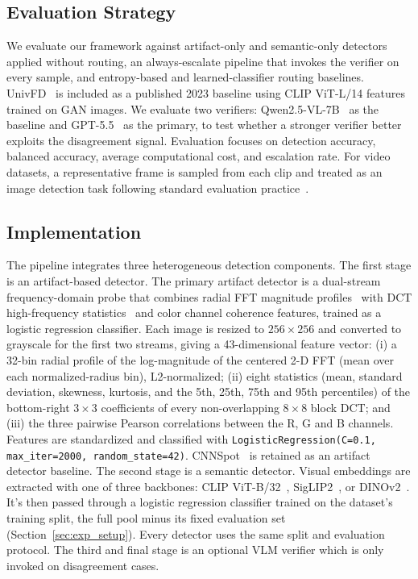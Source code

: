 \documentclass{ieeeaccess}
\begin{document}
\subsection{Evaluation Strategy}
We evaluate our framework against artifact-only and semantic-only detectors applied without routing, an always-escalate pipeline that invokes the verifier on every sample, and entropy-based and learned-classifier routing baselines. UnivFD~\cite{ojha2023fakedetect} is included
as a published 2023 baseline using CLIP ViT-L/14 features trained on GAN images. We
evaluate two verifiers: Qwen2.5-VL-7B~\cite{bai2025qwen25vltechnicalreport} as the
baseline and GPT-5.5~\cite{openai2026gpt55} as the primary, to test whether a stronger verifier better exploits the disagreement signal.
Evaluation focuses on detection accuracy, balanced accuracy, 
average computational cost, and escalation rate. For video 
datasets, a representative frame is sampled from each clip 
and treated as an image detection task following standard 
evaluation practice~\cite{wen2025busterxmllmpoweredaigeneratedvideo}.

\subsection{Implementation}
\label{sec:implementation}

The pipeline integrates three heterogeneous detection components. The first stage is an artifact-based detector. The primary artifact detector is a dual-stream frequency-domain probe that combines radial FFT magnitude profiles~\cite{dzanic2020fourier} with DCT high-frequency statistics~\cite{frank2020leveraging, Corvi_2023_ICASSP} and color channel
coherence features, trained as a logistic regression classifier. Each image is resized
to $256{\times}256$ and converted to grayscale for the first two streams, giving a
43-dimensional feature vector: (i) a 32-bin radial profile of the log-magnitude of the
centered 2-D FFT (mean over each normalized-radius bin), L2-normalized; (ii) eight
statistics (mean, standard deviation, skewness, kurtosis, and the 5th, 25th, 75th and
95th percentiles) of the bottom-right $3{\times}3$ coefficients of every non-overlapping
$8{\times}8$ block DCT; and (iii) the three pairwise Pearson correlations between the R,
G and B channels. Features are standardized and classified with
\texttt{LogisticRegression(C=0.1, max\_iter=2000, random\_state=42)}.
CNNSpot~\cite{wang2020cnn} is retained as an artifact detector baseline. The second stage is a semantic detector. Visual embeddings are extracted with one of three backbones: CLIP
ViT-B/32~\cite{pmlr-v139-radford21a}, SigLIP2~\cite{tschannen2025siglip2}, or
DINOv2~\cite{oquab2023dinov2}. It's then passed through a logistic regression classifier trained on the dataset's training split, the full pool minus its fixed evaluation set (Section~\ref{sec:exp_setup}). Every detector uses the same split and evaluation protocol. The third and final stage is an optional VLM verifier which is only invoked 
on disagreement cases.
\end{document}
